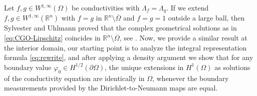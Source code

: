 \documentclass[12pt]{article}
\def\R{\mathbb{R}}
\begin{document}
 Let $f, g\in W^{1,\infty}(\Omega)$ be conductivities with $\Lambda_f=\Lambda_g$. If we extend $f,g\in W^{1,\infty}(\mathbb{R}^n)$ with $f= g$ in $\R^n\setminus \overline{\Omega}$ and $f=g=1$ outside a large ball, then Sylvester and Uhlmann proved that the complex geometrical solutions as in \eqref{eq:CGO-Lipschitz}  coincides in $\R^n\setminus \overline{\Omega}$, see \cite{Sylvester-Uhlmann}. Now, we provide a similar result at the interior domain, our starting point is to analyze the integral representation formula \eqref{eq:rewrite}, and after applying a density argument we show that for any boundary value $\varphi_0\in H^{1/2}(\partial\Omega)$, the unique extensions in $H^1(\Omega)$ as solutions of the conductivity equation are identically in $\Omega$, whenever the boundary measurements provided by the Dirichlet-to-Neumann maps are equal. 
\end{document}

